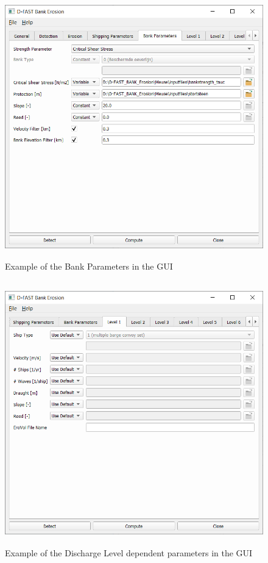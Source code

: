 \begin{figure}[!hb]
\center
\includegraphics[width=\textwidth,height=11.4cm]{figures/gui5.png}
\caption{Example of the Bank Parameters in the GUI}
\label{guiBank}
\vspace{-0.75cm} 
\end{figure}

\clearpage
\begin{figure}[!ht]
\vspace{-0.75cm} 
\center
\includegraphics[width=\textwidth,height=11.4cm]{figures/gui6.png}
\caption{Example of the Discharge Level dependent parameters in the GUI}
\label{guiLevelX}
\vspace{-0.15cm} 
\end{figure}

